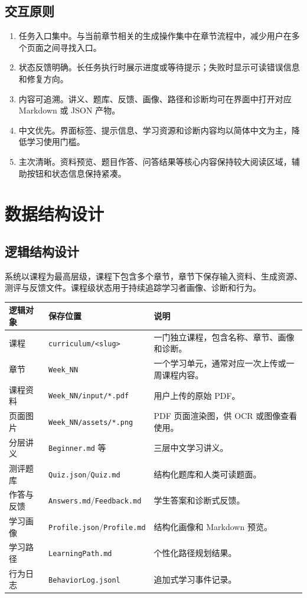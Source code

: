 \documentclass[UTF8,fontset=windows,zihao=-4,openany]{ctexrep}
\begin{document}
\section{交互原则}

\begin{enumerate}
  \item 任务入口集中。与当前章节相关的生成操作集中在章节流程中，减少用户在多个页面之间寻找入口。
  \item 状态反馈明确。长任务执行时展示进度或等待提示；失败时显示可读错误信息和修复方向。
  \item 内容可追溯。讲义、题库、反馈、画像、路径和诊断均可在界面中打开对应 Markdown 或 JSON 产物。
  \item 中文优先。界面标签、提示信息、学习资源和诊断内容均以简体中文为主，降低学习使用门槛。
  \item 主次清晰。资料预览、题目作答、问答结果等核心内容保持较大阅读区域，辅助按钮和状态信息保持紧凑。
\end{enumerate}

\chapter{数据结构设计}

\section{逻辑结构设计}

系统以课程为最高层级，课程下包含多个章节，章节下保存输入资料、生成资源、测评与反馈文件。课程级状态用于持续追踪学习者画像、诊断和行为。

\begin{longtable}{p{}p{}p{}}
\toprule
逻辑对象 & 保存位置 & 说明\\
\midrule
课程 & \texttt{curriculum/<slug>} & 一门独立课程，包含名称、章节、画像和诊断。\\
章节 & \texttt{Week\_NN} & 一个学习单元，通常对应一次上传或一周课程内容。\\
课程资料 & \texttt{Week\_NN/input/*.pdf} & 用户上传的原始 PDF。\\
页面图片 & \texttt{Week\_NN/assets/*.png} & PDF 页面渲染图，供 OCR 或图像查看使用。\\
分层讲义 & \texttt{Beginner.md} 等 & 三层中文学习讲义。\\
测评题库 & \texttt{Quiz.json}/\texttt{Quiz.md} & 结构化题库和人类可读题面。\\
作答与反馈 & \texttt{Answers.md}/\texttt{Feedback.md} & 学生答案和诊断式反馈。\\
学习画像 & \texttt{Profile.json}/\texttt{Profile.md} & 结构化画像和 Markdown 预览。\\
学习路径 & \texttt{LearningPath.md} & 个性化路径规划结果。\\
行为日志 & \texttt{BehaviorLog.jsonl} & 追加式学习事件记录。\\
\bottomrule
\end{longtable}
\end{document}
